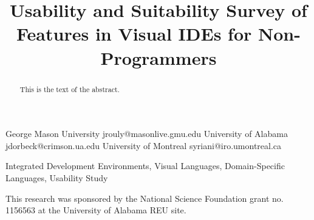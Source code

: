 \documentclass[10pt,preprint]{styles/sigplanconf}
\begin{document}
\setlength{\pdfpageheight}{\paperheight}
\setlength{\pdfpagewidth}{\paperwidth}






\title{Usability and Suitability Survey of Features in Visual IDEs for Non-Programmers}

           {George Mason University}
           {jrouly@masonlive.gmu.edu}
           {University of Alabama}
           {jdorbeck@crimson.ua.edu}
           {University of Montreal}
           {syriani@iro.umontreal.ca}

\maketitle

\begin{abstract}
This is the text of the abstract.
\end{abstract}



\keywords
Integrated Development Environments, Visual Languages, Domain-Specific
Languages, Usability Study














\acks

This research was sponsored by the National Science Foundation grant no. 1156563 at the University of Alabama REU site.



\end{document}
